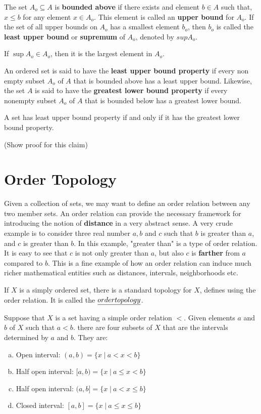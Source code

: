 \documentclass[a4paper,english,12pt]{article}
\begin{document}
\begin{defn}
The set $A_{o} \subseteq A$ is \textbf{bounded above} if there exists and element $b \in A$ such that, $x \le b$ for any element $x \in A_{o}$. This element is called an \textbf{upper bound} for $A_{o}$. If the set of all upper bounds on $A_{o}$ has a smallest element $b_{o}$, then $b_{o}$ is called the \textbf{least upper bound} or \textbf{supremum} of $A_{o}$, denoted by $sup A_{o}$.  

If $\sup A_{o} \in A_{o}$, then it is the largest element in $A_{o}$.
\end{defn}

\begin{defn}
An ordered set is said to have the \textbf{least upper bound property} if every non empty subset $A_{o}$ of $A$ that is bounded above has a least upper bound. Likewise, the set $A$ is said to have the \textbf{greatest lower bound property} if every nonempty subset $A_{o}$ of $A$ that is bounded below has a greatest lower bound. 
\end{defn}

\begin{rem} A set has least upper bound property if and only if it has the greatest lower bound property. 
\end{rem}(Show proof for this claim)

\section{Order Topology}
Given a collection of sets, we may want to define an order relation between any two member sets. An order relation can provide the necessary framework for introducing the notion of \textbf{distance} in a very abstract sense. A very crude example is to consider three real number $a, b$ and $c$ such that $b$
is greater than $a$, and $c$ is greater than $b$. In this example, "greater than" is a type of order relation. It is easy to see that $c$ is not only greater than $a$, but also $c$ is \textbf{farther} from $a$ compared to $b$. This is a fine example of how an order relation can induce much richer mathematical entities such as distances, intervals, neighborhoods etc.  

If $X$ is a simply ordered set, there is a standard topology for $X$, defines using the order relation. It is called the $\emph{order topology}$.

Suppose that $X$ is a set having a simple order relation $<$. Given elements $a$ and $b$ of $X$ such that $a < b$. there are four subsets of $X$ that are the intervals determined by $a$ and $b$. They are:
\begin{enumerate}[a)]
\item Open interval: $(a, b) = \{ x\; | \: a < x < b  \}$
\item Half open interval: $[a, b) = \{ x\; | \: a \le x < b  \}$
\item Half open interval: $(a, b] = \{ x\; | \: a < x \le b  \}$
\item Closed interval: $[a, b] = \{ x\; | \: a \le x \le b  \}$
\end{enumerate} 
\end{document}
